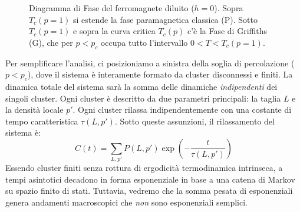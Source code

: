 \begin{figure}[H]
    \centering
    \caption{Diagramma di Fase del ferromagnete diluito ($h=0$). Sopra $T_c(p=1)$ si estende la fase paramagnetica classica (P). Sotto $T_c(p=1)$ e sopra la curva critica $T_c(p)$ c'è la Fase di Griffiths (G), che per $p<p_c$ occupa tutto l'intervallo $0<T<T_c(p=1)$.}
\end{figure}

\noindent Per semplificare l'analisi, ci posizioniamo a sinistra della soglia di percolazione ($p < p_c$), dove il sistema è interamente formato da cluster disconnessi e finiti. La dinamica totale del sistema sarà la somma delle dinamiche \textit{indipendenti} dei singoli cluster.
Ogni cluster è descritto da due parametri principali: la taglia $L$ e la densità locale $p'$. Ogni cluster rilassa indipendentemente con una costante di tempo caratteristica $\tau(L,p')$. Sotto queste assunzioni, il rilassamento del sistema è:
\begin{equation}
    C(t) = \sum_{L, p'} P(L, p') \exp\left( - \frac{t}{\tau(L, p')} \right)
\end{equation}
Essendo cluster finiti senza rottura di ergodicità termodinamica intrinseca, a tempi asintotici decadono in forma esponenziale in base a una catena di Markov su spazio finito di stati. Tuttavia, vedremo che la somma pesata di esponenziali genera andamenti macroscopici che \textit{non} sono esponenziali semplici.


